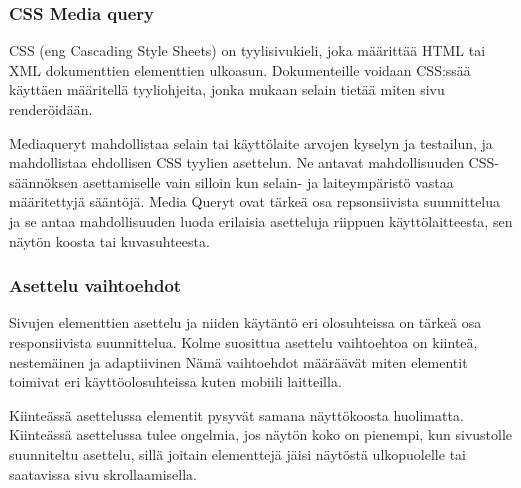 \documentclass[11pt,a4paper,titlepage,oneside]{article}
\begin{document}
\subsubsection{CSS Media query}








CSS (eng Cascading Style Sheets) on tyylisivukieli, joka määrittää HTML tai XML dokumenttien elementtien ulkoasun.
Dokumenteille voidaan CSS:ssää käyttäen määritellä tyyliohjeita, jonka mukaan selain tietää miten sivu renderöidään.
\medskip




Mediaqueryt mahdollistaa selain tai käyttölaite arvojen kyselyn ja testailun,
ja mahdollistaa ehdollisen CSS tyylien asettelun.
Ne antavat mahdollisuuden CSS-säännöksen asettamiselle vain silloin kun selain- ja laiteympäristö vastaa määritettyjä sääntöjä. 
Media Queryt ovat tärkeä osa repsonsiivista suunnittelua ja se antaa mahdollisuuden luoda erilaisia asetteluja riippuen käyttölaitteesta,
sen näytön koosta tai kuvasuhteesta.












\subsubsection{Asettelu vaihtoehdot}





Sivujen elementtien asettelu ja niiden käytäntö eri olosuhteissa on tärkeä osa responsiivista suunnittelua.
Kolme suosittua asettelu vaihtoehtoa on kiinteä, nestemäinen ja adaptiivinen
Nämä vaihtoehdot määräävät miten elementit toimivat eri käyttöolosuhteissa kuten mobiili laitteilla.
\medskip



Kiinteässä asettelussa elementit pysyvät samana näyttökoosta huolimatta. 
Kiinteässä asettelussa tulee ongelmia, jos näytön koko on pienempi, kun sivustolle suunniteltu asettelu, 
sillä joitain elementtejä jäisi näytöstä ulkopuolelle tai saatavissa sivu skrollaamisella.
\medskip
\end{document}
